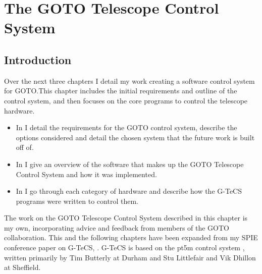\chapter{The GOTO Telescope Control System}
\label{chap:gtecs}
\chaptoc{}


\newpage
\section{Introduction}
\label{sec:gtecs_intro}
\begin{colsection}

Over the next three chapters I detail my work creating a software control system for GOTO.\@ This chapter includes the initial requirements and outline of the control system, and then focuses on the core programs to control the telescope hardware.
%
\begin{itemize}
    \item In  I detail the requirements for the GOTO control system, describe the options considered and detail the chosen system that the future work is built off of.
    \item In  I give an overview of the software that makes up the GOTO Telescope Control System and how it was implemented.
    \item In  I go through each category of hardware and describe how the G-TeCS programs were written to control them.
\end{itemize}
%
The work on the GOTO Telescope Control System described in this chapter is my own, incorporating advice and feedback from members of the GOTO collaboration. This and the following chapters have been expanded from my SPIE conference paper on G-TeCS, \citet{Dyer}. G-TeCS is based on the pt5m control system \citep{pt5m}, written primarily by Tim Butterly at Durham and Stu Littlefair and Vik Dhillon at Sheffield.

\end{colsection}


\newpage
